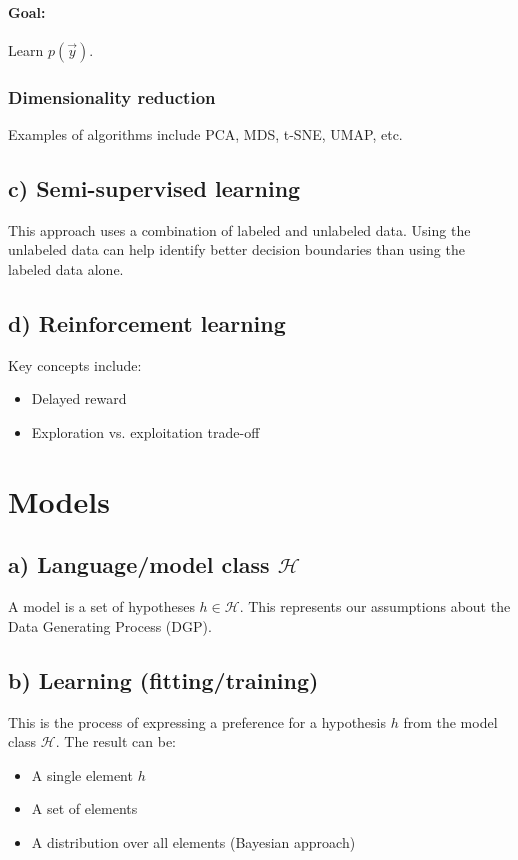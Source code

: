 \documentclass{article}
\begin{document}
\begin{multicols}{2}
	\paragraph{Goal:} Learn $p(\vec{y})$.

	\subsubsection{Dimensionality reduction}
	Examples of algorithms include PCA, MDS, t-SNE, UMAP, etc.

	\subsection{c) Semi-supervised learning}
	This approach uses a combination of labeled and unlabeled data.  Using the unlabeled data can help identify better decision boundaries than using the labeled data alone.

	\subsection{d) Reinforcement learning}
	Key concepts include:
	\begin{itemize}
		\item Delayed reward
		\item Exploration vs. exploitation trade-off
	\end{itemize}

	\section{Models}

	\subsection{a) Language/model class $\mathcal{H}$}
	A model is a set of hypotheses $h \in \mathcal{H}$. This represents our assumptions about the Data Generating Process (DGP).

	\subsection{b) Learning (fitting/training)}
	This is the process of expressing a preference for a hypothesis $h$ from the model class $\mathcal{H}$. The result can be:
	\begin{itemize}
		\item A single element $h$
		\item A set of elements
		\item A distribution over all elements (Bayesian approach)
	\end{itemize}


\end{multicols}
\end{document}
